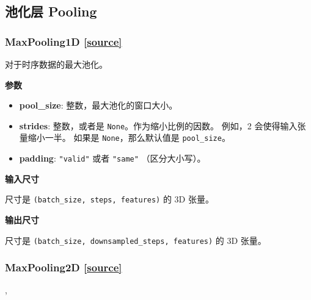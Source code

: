 \subsection{池化层 Pooling}
\subsubsection{MaxPooling1D {\href{https://github.com/keras-team/keras/blob/master/keras/layers/pooling.py\#L57}{{[}source{]}}}}

\begin{Shaded}
\begin{Highlighting}[]
\OperatorTok{=}\OperatorTok{=}\OperatorTok{=}\NormalTok{)}
\end{Highlighting}
\end{Shaded}

对于时序数据的最大池化。

\textbf{参数}

\begin{itemize}
\tightlist
\item
  \textbf{pool\_size}: 整数，最大池化的窗口大小。
\item
  \textbf{strides}: 整数，或者是 \texttt{None}。作为缩小比例的因数。
  例如，2 会使得输入张量缩小一半。 如果是 \texttt{None}，那么默认值是
  \texttt{pool\_size}。
\item
  \textbf{padding}: \texttt{"valid"} 或者 \texttt{"same"}
  （区分大小写）。
\end{itemize}

\textbf{输入尺寸}

尺寸是 \texttt{(batch\_size,\ steps,\ features)} 的 3D 张量。

\textbf{输出尺寸}

尺寸是 \texttt{(batch\_size,\ downsampled\_steps,\ features)} 的 3D
张量。




\subsubsection{MaxPooling2D {\href{https://github.com/keras-team/keras/blob/master/keras/layers/pooling.py\#L170}{{[}source{]}}}}

\begin{Shaded}
\begin{Highlighting}[]
\OperatorTok{=}\NormalTok{(}\NormalTok{, }\OperatorTok{=}\OperatorTok{=},\\
\hspace{4cm}\OperatorTok{=}\NormalTok{)}
\end{Highlighting}
\end{Shaded}

